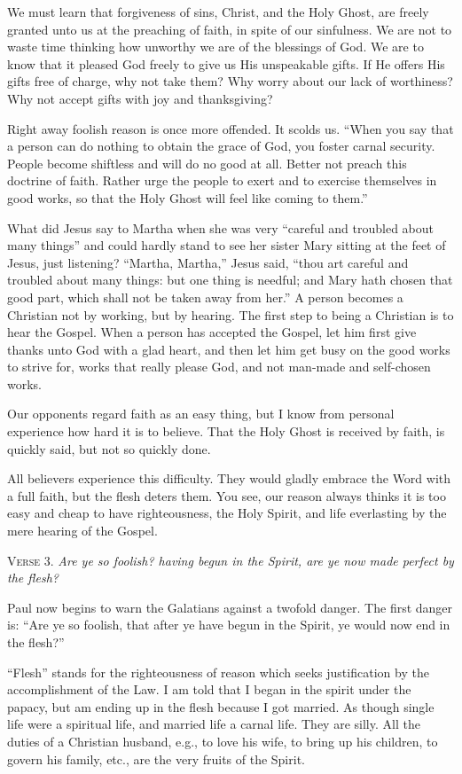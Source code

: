 We must learn that forgiveness of sins, Christ, and the Holy Ghost, are freely granted unto us at the preaching of faith, in spite of our sinfulness. We are not to waste time thinking how unworthy we are of the blessings of God. We are to know that it pleased God freely to give us His unspeakable gifts. If He offers His gifts free of charge, why not take them? Why worry about our lack of worthiness? Why not accept gifts with joy and thanksgiving?

Right away foolish reason is once more offended. It scolds us. “When you say that a person can do nothing to obtain the grace of God, you foster carnal security. People become shiftless and will do no good at all. Better not preach this doctrine of faith. Rather urge the people to exert and to exercise themselves in good works, so that the Holy Ghost will feel like coming to them.”

What did Jesus say to Martha when she was very “careful and troubled about many things” and could hardly stand to see her sister Mary sitting at the feet of Jesus, just listening? “Martha, Martha,” Jesus said, “thou art careful and troubled about many things: but one thing is needful; and Mary hath chosen that good part, which shall not be taken away from her.” A person becomes a Christian not by working, but by hearing. The first step to being a Christian is to hear the Gospel. When a person has accepted the Gospel, let him first give thanks unto God with a glad heart, and then let him get busy on the good works to strive for, works that really please God, and not man-made and self-chosen works.

Our opponents regard faith as an easy thing, but I know from personal experience how hard it is to believe. That the Holy Ghost is received by faith, is quickly said, but not so quickly done.

All believers experience this difficulty. They would gladly embrace the Word with a full faith, but the flesh deters them. You see, our reason always thinks it is too easy and cheap to have righteousness, the Holy Spirit, and life everlasting by the mere hearing of the Gospel.

\textsc{Verse} 3. \emph{Are ye so foolish? having begun in the Spirit, are ye now made perfect by the flesh?}

Paul now begins to warn the Galatians against a twofold danger. The first danger is: “Are ye so foolish, that after ye have begun in the Spirit, ye would now end in the flesh?”

“Flesh” stands for the righteousness of reason which seeks justification by the accomplishment of the Law. I am told that I began in the spirit under the papacy, but am ending up in the flesh because I got married. As though single life were a spiritual life, and married life a carnal life. They are silly. All the duties of a Christian husband, e.g., to love his wife, to bring up his children, to govern his family, etc., are the very fruits of the Spirit.

